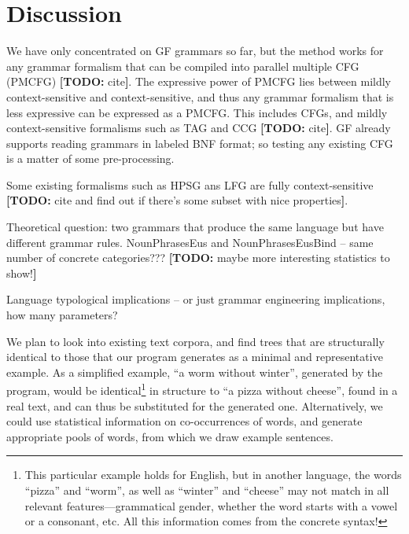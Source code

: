 \documentclass[11pt]{article}
\newcommand{\todo}[1]{{\color{cyan}\textbf{[TODO: }#1\textbf{]}}}
\begin{document}
\section{Discussion}

We have only concentrated on GF grammars so far, but the method works
for any grammar formalism that can be compiled into parallel
multiple CFG (PMCFG) \todo{cite}. The expressive power of PMCFG lies
between mildly context-sensitive and context-sensitive, and thus any
grammar formalism that is less expressive can be expressed as a
PMCFG. This includes CFGs, and mildly context-sensitive formalisms
such as TAG and CCG \todo{cite}. GF already supports reading grammars
in labeled BNF format; so testing any existing CFG is a matter of some
pre-processing.

Some existing formalisms such as HPSG ans LFG are fully
context-sensitive \todo{cite and find out if there's some subset with
  nice properties}.


Theoretical question: two grammars that produce the same language but
have different grammar rules.
NounPhrasesEus and NounPhrasesEusBind -- same number of concrete
categories??? \todo{maybe more interesting statistics to show!}

Language typological implications -- or just grammar engineering implications,
how many parameters?


We plan to look into existing text corpora, and find trees that are
structurally identical  to those that our program generates as a
minimal and representative example. As a simplified example, ``a worm
without winter'', generated by the program, would be identical\footnote{This particular example holds for English, but in another language, the words ``pizza'' and ``worm'', as well as ``winter'' and ``cheese'' may not match in all relevant features---grammatical gender, whether the word starts with a vowel or a consonant, etc. All this information comes from the concrete syntax!} 
in structure to ``a pizza without cheese'', found in a real text, and
can thus be substituted for the generated one.   
Alternatively, we could use statistical information on co-occurrences
of words, and generate appropriate pools of words, from which we draw
example sentences. 



\end{document}
